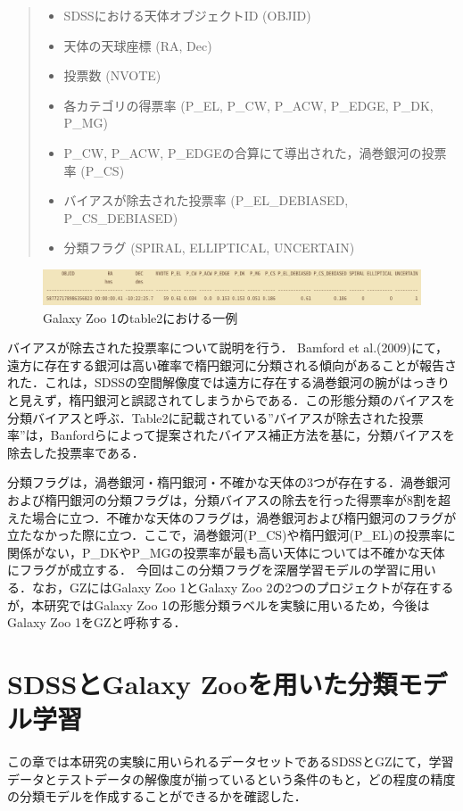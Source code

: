 \documentclass[a4j, 11pt]{jreport}
\begin{document}
\begin{quote}
  \begin{itemize}
   \item SDSSにおける天体オブジェクトID (OBJID)
   \item 天体の天球座標 (RA, Dec)
   \item 投票数 (NVOTE)
   \item 各カテゴリの得票率 (P\_EL, P\_CW, P\_ACW, P\_EDGE, P\_DK, P\_MG)
   \item P\_CW, P\_ACW, P\_EDGEの合算にて導出された，渦巻銀河の投票率 (P\_CS)
   \item バイアスが除去された投票率 (P\_EL\_DEBIASED, P\_CS\_DEBIASED)
   \item 分類フラグ (SPIRAL, ELLIPTICAL, UNCERTAIN)
  \end{itemize}
\end{quote}

\begin{figure}[H]
  \centering
  \includegraphics[width=1\hsize,keepaspectratio]{images/table2.png}
  \caption{Galaxy Zoo 1のtable2における一例}
  \label{fig:table2}
\end{figure}
 

バイアスが除去された投票率について説明を行う．
Bamford et al.(2009)\cite{Bamford2009}にて，遠方に存在する銀河は高い確率で楕円銀河に分類される傾向があることが報告された．これは，SDSSの空間解像度では遠方に存在する渦巻銀河の腕がはっきりと見えず，楕円銀河と誤認されてしまうからである．この形態分類のバイアスを分類バイアスと呼ぶ．Table2に記載されている''バイアスが除去された投票率''は，Banfordらによって提案されたバイアス補正方法を基に，分類バイアスを除去した投票率である．

分類フラグは，渦巻銀河・楕円銀河・不確かな天体の3つが存在する．渦巻銀河および楕円銀河の分類フラグは，分類バイアスの除去を行った得票率が8割を超えた場合に立つ．不確かな天体のフラグは，渦巻銀河および楕円銀河のフラグが立たなかった際に立つ．ここで，渦巻銀河(P\_CS)や楕円銀河(P\_EL)の投票率に関係がない，P\_DKやP\_MGの投票率が最も高い天体については不確かな天体にフラグが成立する．
今回はこの分類フラグを深層学習モデルの学習に用いる．なお，GZにはGalaxy Zoo 1とGalaxy Zoo 2の2つのプロジェクトが存在するが，本研究ではGalaxy Zoo 1の形態分類ラベルを実験に用いるため，今後はGalaxy Zoo 1をGZと呼称する．


\newpage
\chapter{SDSSとGalaxy Zooを用いた分類モデル学習}
この章では本研究の実験に用いられるデータセットであるSDSSとGZにて，学習データとテストデータの解像度が揃っているという条件のもと，どの程度の精度の分類モデルを作成することができるかを確認した．
\end{document}
